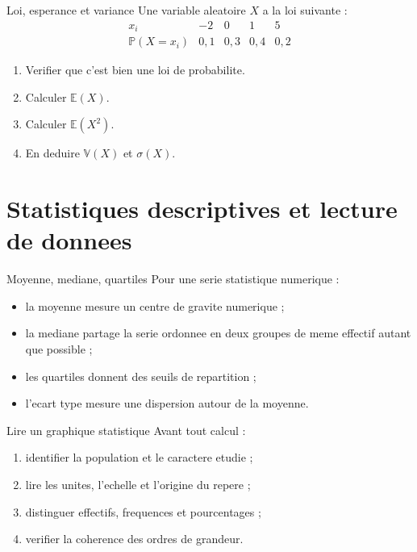 \documentclass[11pt,a4paper]{article}
\newcommand{\E}{\mathbb{E}}
\newcommand{\V}{\mathbb{V}}
\newcommand{\Pp}{\mathbb{P}}
\begin{document}
\begin{exobox}{Loi, esperance et variance}
Une variable aleatoire $X$ a la loi suivante :
\[
\begin{array}{c|cccc}
x_i&-2&0&1&5\\\hline
\Pp(X=x_i)&0,1&0,3&0,4&0,2
\end{array}
\]
\begin{enumerate}
  \item Verifier que c'est bien une loi de probabilite.
  \item Calculer $\E(X)$.
  \item Calculer $\E(X^2)$.
  \item En deduire $\V(X)$ et $\sigma(X)$.
\end{enumerate}
\end{exobox}


\section{Statistiques descriptives et lecture de donnees}

\begin{boitecours}{Moyenne, mediane, quartiles}
Pour une serie statistique numerique :
\begin{itemize}
  \item la moyenne mesure un centre de gravite numerique ;
  \item la mediane partage la serie ordonnee en deux groupes de meme effectif autant que possible ;
  \item les quartiles donnent des seuils de repartition ;
  \item l'ecart type mesure une dispersion autour de la moyenne.
\end{itemize}
\end{boitecours}

\begin{boitemethode}{Lire un graphique statistique}
Avant tout calcul :
\begin{enumerate}
  \item identifier la population et le caractere etudie ;
  \item lire les unites, l'echelle et l'origine du repere ;
  \item distinguer effectifs, frequences et pourcentages ;
  \item verifier la coherence des ordres de grandeur.
\end{enumerate}
\end{boitemethode}
\end{document}
